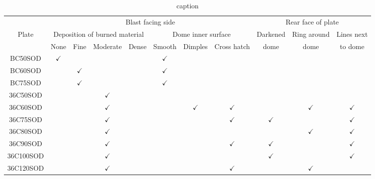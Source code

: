 \begin{table*}[!h]\centering
	\begin{tabular}{|c|  c  c  c  c  c   c  c | c  c  c| }
		\toprule
		          & \multicolumn{7}{|c|}{Blast facing side}                                                         & \multicolumn{3}{c|}{Rear face of plate}    \\
		Plate     & \multicolumn{4}{|c}{Deposition of burned material} & \multicolumn{3}{c|}{Dome inner surface}    & Darkened     & Ring around  & Lines next   \\
		          & None         & Fine         & Moderate     & Dense & Smooth       & Dimples      & Cross hatch  & dome         & dome         & to dome      \\
		\midrule
		BC50SOD   & $\checkmark$ &              &              &       & $\checkmark$ &              &              &              &              &              \\
		BC60SOD   &              & $\checkmark$ &              &       & $\checkmark$ &              &              &              &              &              \\
		BC75SOD   &              & $\checkmark$ &              &       & $\checkmark$ &              &              &              &              &              \\
		36C50SOD  &              &              & $\checkmark$ &       &              &              &              &              &              &              \\
		36C60SOD  &              &              & $\checkmark$ &       &              & $\checkmark$ & $\checkmark$ &              & $\checkmark$ & $\checkmark$ \\
		36C75SOD  &              &              & $\checkmark$ &       &              &              & $\checkmark$ & $\checkmark$ &              & $\checkmark$ \\
		36C80SOD  &              &              & $\checkmark$ &       &              &              &              &              & $\checkmark$ & $\checkmark$ \\
		36C90SOD  &              &              & $\checkmark$ &       &              &              & $\checkmark$ & $\checkmark$ &              & $\checkmark$ \\
		36C100SOD &              &              & $\checkmark$ &       &              &              &              & $\checkmark$ &              & $\checkmark$ \\
		36C120SOD &              &              & $\checkmark$ &       &              &              & $\checkmark$ &              & $\checkmark$ &              \\
		\bottomrule
	\end{tabular}
	\caption{caption}
	\label{tab:restults}
\end{table*}
